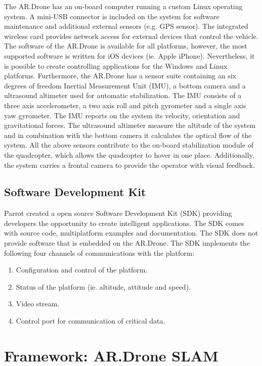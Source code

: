 \documentclass[a4paper]{article}
\begin{document}
The AR.Drone has an on-board computer running a custom Linux operating system. A mini-USB connector is included on the system for software maintenance and additional external sensors (e.g. GPS sensor). The integrated wireless card provides network access for external devices that control the vehicle. The software of the AR.Drone is available for all platforms, however, the most supported software is written for iOS devices (ie. Apple iPhone). Nevertheless, it is possible to create controlling applications for the Windows and Linux platforms. Furthermore, the AR.Drone has a sensor suite containing an six degrees of freedom Inertial Measurement Unit (IMU), a bottom camera and a ultrasound altimeter used for automatic stabilization. The IMU consists of a three axis accelerometer, a two axis roll and pitch gyrometer and a single axis yaw gyrometer. The IMU reports on the system its velocity, orientation and gravitational forces. The ultrasound altimeter measure the altitude of the system and in combination with the bottom camera it calculates the optical flow of the system. All the above sensors contribute to the on-board stabilization module of the quadcopter, which allows the quadcopter to hover in one place. Additionally, the system carries a frontal camera to provide the operator with visual feedback.

\subsection{Software Development Kit}
Parrot created a open source Software Development Kit (SDK) providing developers the opportunity to create intelligent applications. The SDK comes with source code, multiplatform examples and documentation. The SDK does not provide software that is embedded on the AR.Drone. The SDK implements the following four channels of communications with the platform:
\begin{enumerate}
\item Configuration and control of the platform.
\item Status of the platform (ie. altitude, attitude and speed).
\item Video stream.
\item Control port for communication of critical data.
\end{enumerate}

\section{Framework: AR.Drone SLAM}
\end{document}
